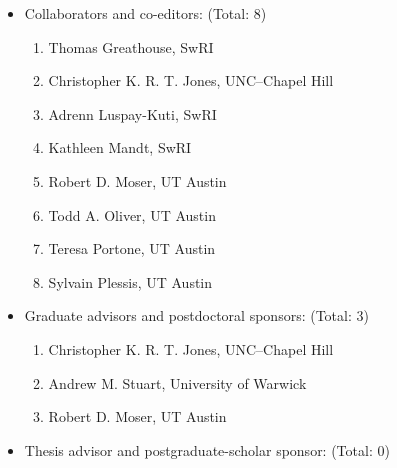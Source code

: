 \documentclass[11pt]{article}
\begin{document}
\begin{itemize}
  \item Collaborators and co-editors: (Total: 8)
    \begin{enumerate}
      \item Thomas Greathouse, SwRI
      \item Christopher K. R. T. Jones, UNC--Chapel Hill
      \item Adrenn Luspay-Kuti, SwRI
      \item Kathleen Mandt, SwRI
      \item Robert D. Moser, UT Austin
      \item Todd A. Oliver, UT Austin
      \item Teresa Portone, UT Austin
      \item Sylvain Plessis, UT Austin
    \end{enumerate}
  \item Graduate advisors and postdoctoral sponsors: (Total: 3)
    \begin{enumerate}
      \item Christopher K. R. T. Jones, UNC--Chapel Hill
      \item Andrew M. Stuart, University of Warwick
      \item Robert D. Moser, UT Austin
    \end{enumerate}
  \item Thesis advisor and postgraduate-scholar sponsor: (Total: 0)
\end{itemize}
\end{document}
